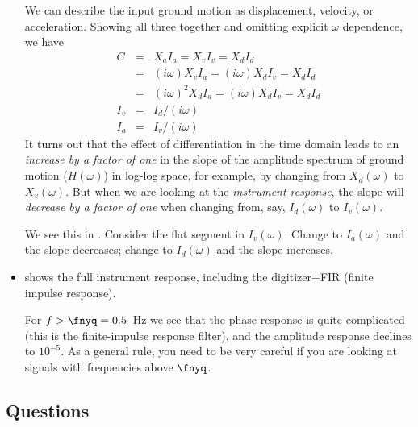 \documentclass[11pt,titlepage,fleqn]{article}
\begin{document}
\begin{itemize}
We can describe the input ground motion as displacement, velocity, or acceleration. Showing all three together and omitting explicit $\omega$ dependence, we have
%
\begin{eqnarray}
C &=& X_a I_a = X_v I_v =  X_d I_d 
\\
&=& (i\omega) X_v I_a = (i\omega) X_d I_v =  X_d I_d 
\\
&=& (i\omega)^2 X_d I_a = (i\omega) X_d I_v =  X_d I_d 
\\
I_v &=& I_d / (i\omega)
\\
I_a &=& I_v / (i\omega)
\end{eqnarray}
%
It turns out that the effect of differentiation in the time domain leads to an {\em increase by a factor of one} in the slope of the amplitude spectrum of ground motion ($H(\omega)$) in log-log space, for example, by changing from $X_d(\omega)$ to $X_v(\omega)$. But when we are looking at the {\em instrument response}, the slope will {\em decrease by a factor of one} when changing from, say, $I_d(\omega)$ to $I_v(\omega)$.

We see this in . Consider the flat segment in $I_v(\omega)$. Change to $I_a(\omega)$ and the slope decreases; change to $I_d(\omega)$ and the slope increases.


\item {} shows the full instrument response, including the digitizer+FIR (finite impulse response).

For $f > \fnyq = 0.5$~Hz we see that the phase response is quite complicated (this is the finite-impulse response filter), and the amplitude response declines to $10^{-5}$. As a general rule, you need to be very careful if you are looking at signals with frequencies above $\fnyq$.


\end{itemize}


\subsection*{Questions}
\end{document}
